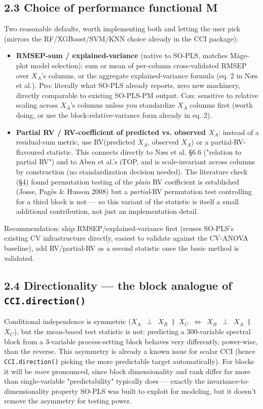 \documentclass[11pt,a4paper]{article}
\begin{document}
	\subsection{2.3 Choice of performance functional M}
	
	Two reasonable defaults, worth implementing both and letting the user pick (mirrors the RF/XGBoost/SVM/KNN choice already in the CCI package):
	
	\begin{itemize}
		\item \textbf{RMSEP-sum / explained-variance} (native to SO-PLS, matches Måge-plot model selection): sum or mean of per-column cross-validated RMSEP over \(X_A\)'s columns, or the aggregate explained-variance formula (eq. 2 in Næs et al.). Pro: literally what SO-PLS already reports, zero new machinery, directly comparable to existing SO-PLS-PM output. Con: sensitive to relative scaling across \(X_A\)'s columns unless you standardize \(X_A\) columns first (worth doing, or use the block-relative-variance form already in eq. 2).
		\item \textbf{Partial RV / RV-coefficient of predicted vs. observed \(X_A\)}: instead of a residual-sum metric, use RV(predicted \(X_A\), observed \(X_A\)) or a partial-RV-flavoured statistic. This connects directly to Næs et al. \S{}6.6 ("relation to partial RV") and to Aben et al.'s iTOP, and is scale-invariant across columns by construction (no standardization decision needed). The literature check (\S{}4) found permutation testing of the \emph{plain} RV coefficient is established (Josse, Pagès \& Husson 2008) but a \emph{partial}-RV permutation test controlling for a third block is not — so this variant of the statistic is itself a small additional contribution, not just an implementation detail.
		
	\end{itemize}
	Recommendation: ship RMSEP/explained-variance first (reuses SO-PLS's existing CV infrastructure directly, easiest to validate against the CV-ANOVA baseline), add RV/partial-RV as a second statistic once the basic method is validated.
	
	\subsection{2.4 Directionality — the block analogue of \texttt{CCI.direction()}}
	
	Conditional independence is symmetric (\texttt{\(X_A\) \(\perp\) \(X_B\) | \(X_C\) \(\Longleftrightarrow\) \(X_B\) \(\perp\) \(X_A\) | \(X_C\)}), but the mean-based test statistic is not: predicting a 300-variable spectral block from a 3-variable process-setting block behaves very differently, power-wise, than the reverse. This asymmetry is already a known issue for scalar CCI (hence \texttt{CCI.direction()} picking the more predictable target automatically). For blocks it will be \emph{more} pronounced, since block dimensionality and rank differ far more than single-variable "predictability" typically does — exactly the invariance-to-dimensionality property SO-PLS was built to exploit for modeling, but it doesn't remove the asymmetry for testing power.
	
\end{document}
